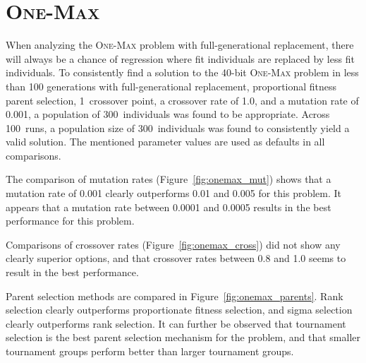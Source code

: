 \documentclass[paper=a4, fontsize=10pt]{scrartcl} %
\begin{document}
\vspace{-0.35cm}

\section*{\textsc{One-Max}}

\setlength\parindent{17pt}
When analyzing the \textsc{One-Max} problem with full-generational replacement, there will always be a chance of regression where fit individuals are replaced by less fit individuals. To consistently find a solution to the 40-bit \textsc{One-Max} problem in less than 100 generations with full-generational replacement, proportional fitness parent selection, 1~crossover point, a crossover rate of 1.0, and a mutation rate of 0.001, a population of 300~individuals was found to be appropriate. Across 100~runs, a population size of 300~individuals was found to consistently yield a valid solution. The mentioned parameter values are used as defaults in all comparisons.

The comparison of mutation rates (Figure~\ref{fig:onemax_mut}) shows that a mutation rate of 0.001 clearly outperforms 0.01 and 0.005 for this problem. It appears that a mutation rate between 0.0001 and 0.0005 results in the best performance for this problem.

Comparisons of crossover rates (Figure~\ref{fig:onemax_cross}) did not show any clearly superior options, and that crossover rates between 0.8 and 1.0 seems to result in the best performance.

Parent selection methods are compared in Figure~\ref{fig:onemax_parents}. Rank selection clearly outperforms proportionate fitness selection, and sigma selection clearly outperforms rank selection. It can further be observed that tournament selection is the best parent selection mechanism for the problem, and that smaller tournament groups perform better than larger tournament groups.
\setlength\parindent{0pt}

\newcommand{\displayplots}[2]{
    \addplot[#2, mark=none] table[x index=0,y index=2,col sep=space] {../data/#1-run-1.txt};
    \addplot[#2, mark=none] table[x index=0,y index=2,col sep=space] {../data/#1-run-2.txt};
    \addplot[#2, mark=none] table[x index=0,y index=2,col sep=space] {../data/#1-run-3.txt};
    \addplot[#2, mark=none] table[x index=0,y index=2,col sep=space] {../data/#1-run-4.txt};
    \addplot[#2, mark=none] table[x index=0,y index=2,col sep=space] {../data/#1-run-5.txt};
    \addplot[#2, mark=none, densely dotted] table[x index=0,y index=1,col sep=space] {../data/#1-run-1.txt};
    \addplot[#2, mark=none, densely dotted] table[x index=0,y index=1,col sep=space] {../data/#1-run-2.txt};
    \addplot[#2, mark=none, densely dotted] table[x index=0,y index=1,col sep=space] {../data/#1-run-3.txt};
    \addplot[#2, mark=none, densely dotted] table[x index=0,y index=1,col sep=space] {../data/#1-run-4.txt};
    \addplot[#2, mark=none, densely dotted] table[x index=0,y index=1,col sep=space] {../data/#1-run-5.txt};
}
\end{document}
